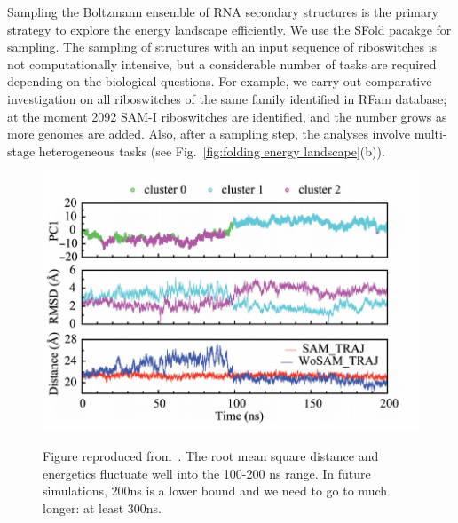 \documentclass[a4paper,11pt]{article}
\newcommand{\up}{\vspace*{-1em}}
\begin{document}
Sampling the Boltzmann ensemble of RNA secondary structures is the primary strategy to explore the energy landscape efficiently.  We use the SFold pacakge\cite{ding2006} for sampling. The sampling of structures with an input sequence of riboswitches is not computationally intensive, but a considerable number of tasks are required depending on the biological questions.  For example, we carry out comparative investigation on all riboswitches of the same family identified in RFam database; at the moment 2092 SAM-I riboswitches are identified, and the number grows as more genomes are added.  Also, after a sampling step, the analyses involve multi-stage heterogeneous tasks (see Fig.~\ref{fig:folding energy landscape}(b)).  


\begin{figure}%
\begin{center}
  \includegraphics[scale=0.4]{Figure3}
   \caption{ Figure reproduced from~\cite{SAM-I-NAR2009}. The root mean square distance and energetics fluctuate well into the 100-200 ns range. In future simulations, 200ns is a lower bound and we need to go to much longer: at least 300ns.
}
\up\up
\label{fig:Fig3}
\end{center}
\end{figure}
\end{document}
